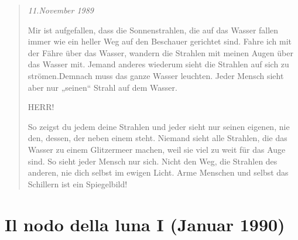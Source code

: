 \documentclass[10pt,titlepage,a5paper]{book}
\newenvironment{tg}{\begin{quote}\em}{\end{quote}}
\begin{document}
\begin{tg}
11.November 1989

Mir ist aufgefallen, dass die Sonnenstrahlen, die auf das Wasser fallen immer wie ein heller Weg auf den Beschauer gerichtet sind. Fahre ich mit der Fähre über das Wasser, wandern die Strahlen mit meinen Augen über das Wasser mit. Jemand anderes wiederum sieht die Strahlen auf sich zu strömen.Demnach muss das ganze Wasser leuchten. Jeder Mensch sieht aber nur „seinen“ Strahl auf dem Wasser.

HERR!

So zeigst du jedem deine Strahlen und jeder sieht nur seinen eigenen, nie den, dessen, der neben einem steht. Niemand sieht alle Strahlen, die das Wasser zu einem Glitzermeer machen, weil sie viel zu weit für das Auge sind. So sieht jeder Mensch nur sich. Nicht den Weg, die Strahlen des anderen, nie dich selbst im ewigen Licht. Arme Menschen und selbst das Schillern ist ein Spiegelbild!
\end{tg}


\section*{Il nodo della luna I (Januar 1990)}
\end{document}
